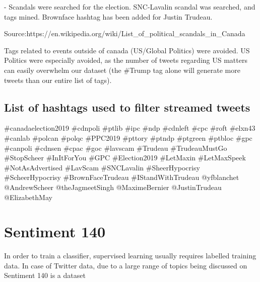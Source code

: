\documentclass[11pt]{article}
\begin{document}
    - Scandals were searched for the election.
    SNC-Lavalin scandal was searched, and tags mined.
    Brownface hashtag has been added for Justin Trudeau.

    Source:https://en.wikipedia.org/wiki/List_of_political_scandals_in_Canada

    Tags related to events outside of canada (US/Global Politics) were avoided.
    US Politics were especially avoided, as the number of tweets regarding US matters can easily overwhelm our dataset (the #Trump tag alone will generate more tweets than our entire list of tags).

    \subsection{List of hashtags used to filter streamed tweets} \label{subsec:list_of_hashtags}

    #canadaelection2019 #cdnpoli #ptlib #ipc #ndp #cdnleft #cpc #roft #elxn43 #canlab #polcan #polqc #PPC2019 #pttory #ptndp #ptgreen
    #ptbloc #gpc #canpoli #cdnsen #cpac #goc #lavscam #Trudeau #TrudeauMustGo #StopScheer #InItForYou #GPC #Election2019 #LetMaxin
    #LetMaxSpeek #NotAsAdvertised #LavScam #SNCLavalin #SheerHypocrisy #ScheerHypocrisy #BrownFaceTrudeau #IStandWithTrudeau
    @yfblanchet @AndrewScheer @theJagmeetSingh @MaximeBernier @JustinTrudeau @ElizabethMay

    \section{Sentiment 140} \label{sec:sentiment_140}

    In order to train a classifier, supervised learning usually requires labelled training data.
    In case of Twitter data, due to a large range of topics being discussed on 
    Sentiment 140 is a dataset
\end{document}
